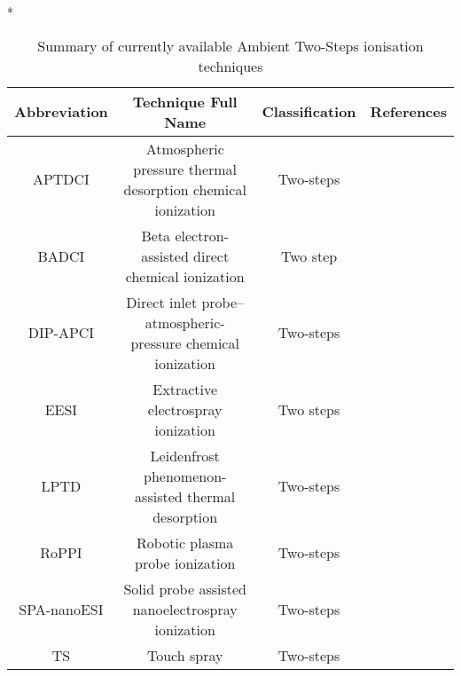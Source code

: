 \begin{table}{*}
\caption{Summary of currently available Ambient Two-Steps ionisation techniques}
\label{table:Ambient_TwoSteps}

\centering 
\scriptsize

    \begin{tabular}{|c|c|c|l|}
        \hline
        \textbf{Abbreviation}  & \textbf{Technique Full Name} & \textbf{Classification} & \textbf{References} \\ 
        \hline \hline 
        APTDCI & Atmospheric pressure thermal desorption chemical ionization & Two-steps & \cite{21683155} \\
        BADCI & Beta electron-assisted direct chemical ionization & Two step &  \cite{19641814} \\
        DIP-APCI & Direct inlet probe–atmospheric-pressure chemical ionization & Two-steps & \cite{23912829} \\
        EESI & Extractive electrospray ionization & Two steps & \cite{16767269} \\
        LPTD & Leidenfrost phenomenon-assisted thermal desorption & Two-steps & \cite{23423791} \\
        RoPPI & Robotic plasma probe ionization & Two-steps & \cite{24603806} \\
        SPA-nanoESI & Solid probe assisted nanoelectrospray ionization & Two-steps & \cite{22937532} \\
        TS & Touch spray & Two-steps & \cite{24756256} \\
        \hline \hline 
    \end{tabular}
\end{table}
